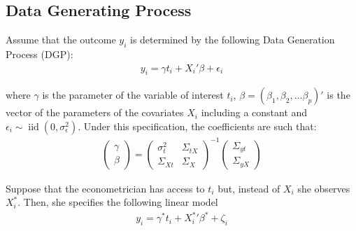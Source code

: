 \documentclass[12pt]{article}
\def\b{\beta}
\def\g{\gamma}
\begin{document}
    \subsection*{Data Generating Process}

        Assume that the outcome $y_i$ is determined by the following Data Generation Process (DGP):
        \begin{align}
            y_i = \gamma t_i + X_i'\beta + \epsilon_i
        \end{align}

        where $\g$ is the parameter of the variable of interest $t_i$, $\b=(\b_1,\b_2,\dots \b_p)'$ is the vector of the parameters of the covariates $X_i$ including a constant and $\epsilon_i \sim \operatorname{iid}(0,\sigma^2_\epsilon)$. Under this specification, the coefficients are such that:
        \begin{align}
            \left(\begin{array}{l}
        {\gamma} \\
        {\beta}
        \end{array}\right)=\left(\begin{array}{cc}
        {\sigma}^2_{t} & \Sigma_{tX} \\
        \Sigma_{Xt} & {\Sigma}_{X}
        \end{array}\right)^{-1}\left(\begin{array}{c}
        \Sigma_{yt} \\
        \Sigma_{yX}
        \end{array}\right)
        \end{align}

        Suppose that the econometrician has access to $t_i$ but, instead of $X_i$ she observes $X^*_i$. Then, she specifies the following linear model
        \begin{align}
            y_i = \gamma^* t_i + {X^{*}_i}' \beta^* + \zeta_i
        \end{align}
\end{document}
